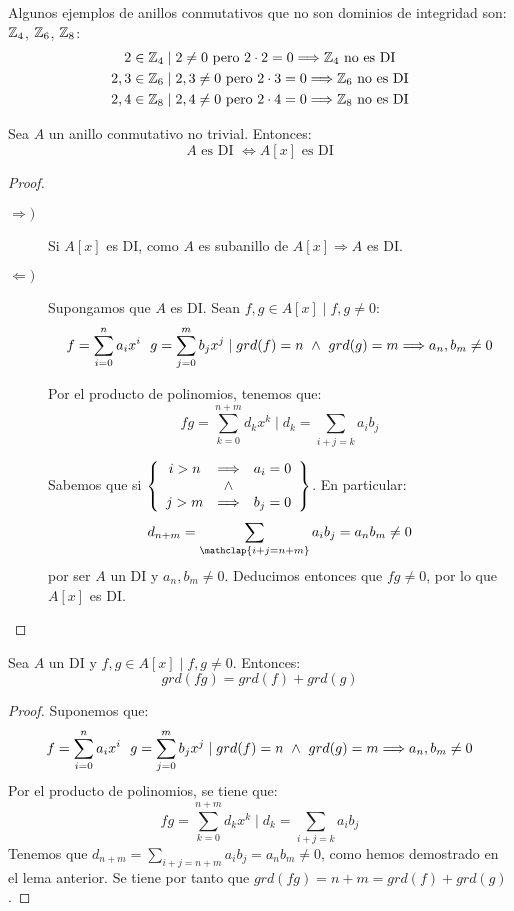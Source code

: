 \begin{ejemplo}
    Algunos ejemplos de anillos conmutativos que no son dominios de integridad son: $\mathbb Z_4$, $\mathbb Z_6$, $\mathbb Z_8$:
    \begin{gather*}
        2 \in \mathbb Z_4 \mid 2 \neq 0 \mbox{ pero } 2\cdot 2 = 0 \Longrightarrow \mathbb Z_4 \mbox{ no es DI}\\
        2,3 \in \mathbb Z_6 \mid 2,3 \neq 0 \mbox{ pero } 2 \cdot 3 = 0 \Longrightarrow \mathbb Z_6 \mbox{ no es DI}\\
        2,4 \in \mathbb Z_8 \mid 2,4 \neq 0 \mbox{ pero } 2 \cdot 4 = 0 \Longrightarrow \mathbb Z_8 \mbox{ no es DI}
    \end{gather*}
\end{ejemplo}

\begin{teo}
    Sea $A$ un anillo conmutativo no trivial. Entonces:
    $$A \mbox{ es DI } \Longleftrightarrow A[x] \mbox{ es DI}$$
\end{teo}
\begin{proof}\
\begin{description}
    \item[$\Longrightarrow)$] Si $A[x]$ es DI, como $A$ es subanillo de $A[x] \Longrightarrow A$ es DI.
    \item[$\Longleftarrow)$]
    Supongamos que $A$ es DI. Sean $f,g \in A[x] \mid f,g \neq 0$:
    $$f= \sum_{i=0}^n a_i x^i~~g = \sum_{j=0}^m b_j x^j \mid grd(f) = n \ \land \  grd(g) = m \Longrightarrow a_n, b_m \neq 0$$

    Por el producto de polinomios, tenemos que:
    $$fg = \sum_{k=0}^{n+m} d_k x^k \mid d_k = \sum_{i+j=k}a_i b_j$$

    Sabemos que si $\left\{\begin{array}{ccc}
            i>n & \Longrightarrow & a_i=0\\
             & \ \land \  & \\
            j>m & \Longrightarrow & b_j=0
        \end{array}\right\}$.
    En particular:
    $$d_{n+m} = \sum\limits_{\mathclap{i+j=n+m}}a_ib_j = a_n b_m \neq 0$$ por ser $A$ un DI y  $a_n, b_m \neq 0$. Deducimos entonces que $fg \neq 0$, por lo que $A[x]$ es DI.
\end{description}
\end{proof}

\begin{lema}
    \label{lema:GradoProductoDI}
    Sea $A$ un DI y $f,g \in A[x] \mid f,g \neq 0$. Entonces:
    $$grd(fg) = grd(f) + grd(g)$$
\end{lema}
\begin{proof}
    Suponemos que:
    $$f= \sum_{i=0}^n a_i x^i~~g = \sum_{j=0}^m b_j x^j \mid grd(f) = n \ \land \  grd(g) = m \Longrightarrow a_n, b_m \neq 0$$
    Por el producto de polinomios, se tiene que:
    $$fg = \sum_{k=0}^{n+m} d_k x^k \mid d_k = \sum_{i+j=k} a_i b_j$$
    Tenemos que $\displaystyle d_{n+m} = \sum_{i+j=n+m} a_ib_j = a_n b_m \neq 0$, como hemos demostrado en el lema anterior. Se tiene por tanto que $grd(fg) = n+m = grd(f) + grd(g)$.
\end{proof}

